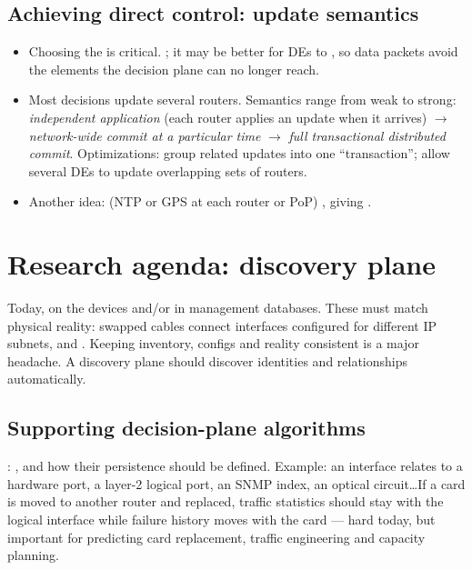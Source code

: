 \subsection{Achieving direct control: update semantics}
\begin{itemize}
\item Choosing the  is critical. ; it may be better for DEs to , so data packets avoid the elements the decision plane can no longer reach.
\item Most decisions update several routers. Semantics range from weak to strong: \emph{independent application} (each router applies an update when it arrives) $\rightarrow$ \emph{network-wide commit at a particular time} $\rightarrow$ \emph{full transactional distributed commit}. Optimizations: group related updates into one ``transaction''; allow several DEs to update overlapping sets of routers.
\item Another idea:  (NTP or GPS at each router or PoP) , giving .
\end{itemize}

\section{Research agenda: discovery plane}
Today,  on the devices and/or in management databases. These must match physical reality: swapped cables connect interfaces configured for different IP subnets, and . Keeping inventory, configs and reality consistent is a major headache. A discovery plane should discover identities and relationships automatically.

\subsection{Supporting decision-plane algorithms}
: , and how their persistence should be defined. Example: an interface relates to a hardware port, a layer-2 logical port, an SNMP index, an optical circuit\ldots If a card is moved to another router and replaced, traffic statistics should stay with the logical interface while failure history moves with the card --- hard today, but important for predicting card replacement, traffic engineering and capacity planning.

